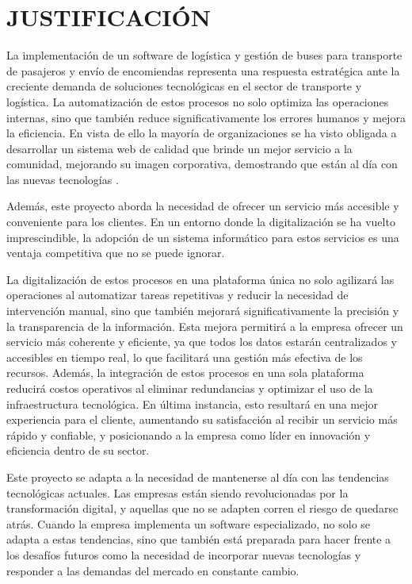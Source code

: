 \section{JUSTIFICACIÓN}

	La implementación de un software de logística y gestión de buses para transporte de pasajeros y envío de encomiendas representa una respuesta estratégica ante la creciente demanda de soluciones tecnológicas en el sector de transporte y logística. La automatización de estos procesos no solo optimiza las operaciones internas, sino que también reduce significativamente los errores humanos y mejora la eficiencia. En vista de ello la mayoría de organizaciones se ha visto obligada a desarrollar un sistema web de calidad que brinde un mejor servicio a la comunidad, mejorando su imagen corporativa, demostrando que están al día con las nuevas tecnologías \parencite{nunez2005diseno}.
	
	Además, este proyecto aborda la necesidad de ofrecer un servicio más accesible y conveniente para los clientes. En un entorno donde la digitalización se ha vuelto imprescindible, la adopción de un sistema informático para estos servicios es una ventaja competitiva que no se puede ignorar.
	
	La digitalización de estos procesos en una plataforma única no solo agilizará las operaciones al automatizar tareas repetitivas y reducir la necesidad de intervención manual, sino que también mejorará significativamente la precisión y la transparencia de la información. Esta mejora permitirá a la empresa ofrecer un servicio más coherente y eficiente, ya que todos los datos estarán centralizados y accesibles en tiempo real, lo que facilitará una gestión más efectiva de los recursos. Además, la integración de estos procesos en una sola plataforma reducirá costos operativos al eliminar redundancias y optimizar el uso de la infraestructura tecnológica. En última instancia, esto resultará en una mejor experiencia para el cliente, aumentando su satisfacción al recibir un servicio más rápido y confiable, y posicionando a la empresa como líder en innovación y eficiencia dentro de su sector.
	
	Este proyecto se adapta a la necesidad de mantenerse al día con las tendencias tecnológicas actuales. Las empresas están siendo revolucionadas por la transformación digital, y aquellas que no se adapten corren el riesgo de quedarse atrás. Cuando la empresa implementa un software especializado, no solo se adapta a estas tendencias, sino que también está preparada para hacer frente a los desafíos futuros como la necesidad de incorporar nuevas tecnologías y responder a las demandas del mercado en constante cambio.
	
